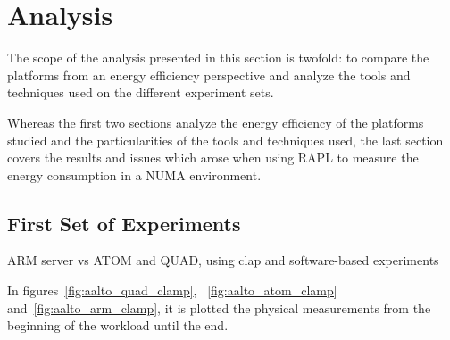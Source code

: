 \chapter{Analysis}



The scope of the analysis presented in this section is twofold: to compare the
platforms from an energy efficiency perspective and analyze the tools and techniques used on the different experiment sets. 

Whereas the first two sections analyze the energy efficiency of the platforms
studied and the particularities of the tools and techniques used, the last 
section covers the results and issues which arose when using RAPL to measure 
the energy consumption in a NUMA environment.

\section{First Set of Experiments}
ARM server vs ATOM and QUAD, using clap and software-based experiments

In figures~\ref{fig:aalto_quad_clamp}, ~\ref{fig:aalto_atom_clamp} 
and~\ref{fig:aalto_arm_clamp}, it is plotted the physical measurements from the
beginning of the workload until the end.

